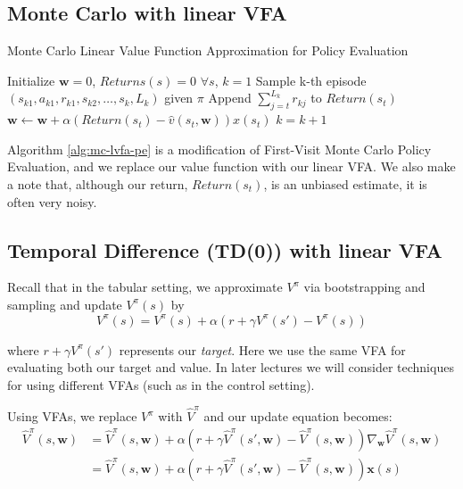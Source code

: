 \documentclass{article}
\newcommand{\w}{\mathbf{w}}
\begin{document}
\subsection{Monte Carlo with linear VFA}

\begin{algorithm}
\caption{Monte Carlo Linear Value Function Approximation for Policy Evaluation}\label{alg:mc-lvfa-pe}
\begin{algorithmic}[1]
\State Initialize $\w = 0$, $Returns(s)=0$ $\forall s$, $k = 1$
\Loop
\State Sample k-th episode $(s_{k1}, a_{k1},r_{k1},s_{k2}, \ldots, s_{k},L_{k})$ given $\pi$
\State Append $\sum_{j=t}^{L_k} r_{kj}$ to $Return(s_t)$
\State $\w \gets \w + \alpha (Return(s_t)-\hat{v} (s_t,\w)) x(s_t)$
\EndIf
\EndFor
\State $k=k+1$
\EndLoop
\end{algorithmic}
\end{algorithm}

Algorithm \ref{alg:mc-lvfa-pe} is a modification of First-Visit Monte Carlo Policy Evaluation, and we replace our value function with our linear VFA. We also make a note that, although our return, $Return(s_t)$, is an unbiased estimate, it is often very noisy.

\subsection{Temporal Difference (TD(0)) with linear VFA}

Recall that in the tabular setting, we approximate $V^{\pi}$ via bootstrapping and sampling and update $V^{\pi}(s)$ by
\begin{equation*}
V^{\pi}(s) = V^{\pi}(s) + \alpha (r+\gamma V^{\pi}(s') - V^{\pi}(s))
\end{equation*}

where $r+\gamma V^{\pi}(s')$ represents our \textit{target}. Here we use the same VFA for evaluating both our target and value. In later lectures we will consider techniques for using different VFAs (such as in the control setting).

Using VFAs, we replace $V^{\pi}$ with $\hat{V}^{\pi}$ and our update equation becomes:
\begin{align*}
\hat{V}^{\pi}(s,\w) & = \hat{V}^{\pi}(s,\w) + \alpha (r+\gamma \hat{V}^{\pi}(s',\w) - \hat{V}^{\pi}(s,\w)) \nabla_{\w} \hat{V}^{\pi}(s,\w) \\
& = \hat{V}^{\pi}(s,\w) + \alpha (r+\gamma \hat{V}^{\pi}(s',\w) - \hat{V}^{\pi}(s,\w)) \mathbf{x}(s)
\end{align*}
\end{document}

